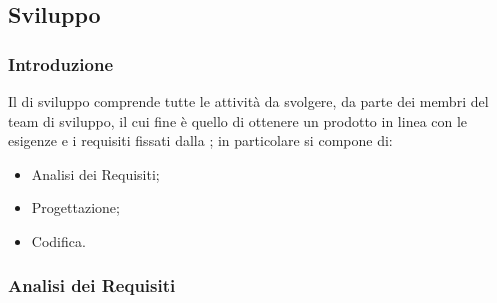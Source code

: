 \subsection{Sviluppo}

\subsubsection{Introduzione}
Il  di sviluppo comprende tutte le attività da svolgere, da parte dei membri del team di sviluppo, il cui fine è quello di ottenere un prodotto in linea con le esigenze e i requisiti fissati dalla ; in particolare si compone di:
\begin{itemize}
    \item Analisi dei Requisiti;
    \item Progettazione;
    \item Codifica.
\end{itemize} 

\subsubsection{Analisi dei Requisiti} \label{sec:analisi-rischi}

